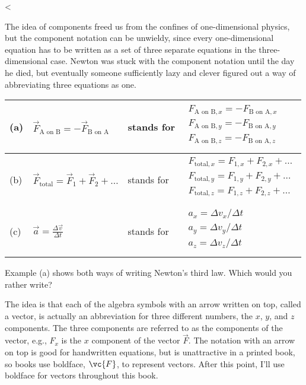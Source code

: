 <%

The idea of components freed us from the confines of
one-dimensional physics, but the component notation can be
unwieldy, since every one-dimensional equation has to be
written as a set of three separate equations in the
three-dimensional case. Newton was stuck with the component
notation until the day he died, but eventually someone
sufficiently lazy and clever figured out a way of abbreviating
three equations as one.

\noindent \begin{tabular}{|llll|}
\hline
(a)  &  $\overrightarrow{F}_{\text{A on B}}=-\overrightarrow{F}_{\text{B on A}}$   &   stands for  &  
  $\begin{matrix}
    F_{\text{A on B},x} = -F_{\text{B on A},x}  \\
    F_{\text{A on B},y} = -F_{\text{B on A},y}  \\
    F_{\text{A on B},z} = -F_{\text{B on A},z}  \\
  \end{matrix}$ \\
\hline
(b)  &  $\overrightarrow{F}_{\text{total}}=\overrightarrow{F}_1+\overrightarrow{F}_2+\ldots$   &   stands for  &  
  $\begin{matrix}
    F_{\text{total},x} = F_{1,x}+F_{2,x}+\ldots\\
    F_{\text{total},y} = F_{1,y}+F_{2,y}+\ldots\\
    F_{\text{total},z} = F_{1,z}+F_{2,z}+\ldots\\
  \end{matrix}$ \\
\hline
(c)  &  $\overrightarrow{a}=\frac{\Delta \overrightarrow{v}}{\Delta t}$   &   stands for  &  
  $\begin{matrix}
    a_x = \Delta v_x / \Delta t \\
    a_y = \Delta v_y / \Delta t \\
    a_z = \Delta v_z / \Delta t \\
  \end{matrix}$ \\
\hline
\end{tabular}

\noindent Example (a) shows both ways of writing Newton's third law.
Which would you rather write?

\pagebreak

The idea is that each of the algebra symbols with an arrow
written on top, called a vector, is
actually an abbreviation for three different numbers, the
$x$, $y$, and $z$ components. The three components are referred
to as the components of the vector, e.g., $F_x$ is the $x$
component of the vector $\overrightarrow{F}$. The notation with an arrow on top
is good for handwritten equations, but is unattractive in a
printed book, so books use boldface, $\vc{F}$, to represent
vectors. After this point, I'll use boldface for vectors
throughout this book.

